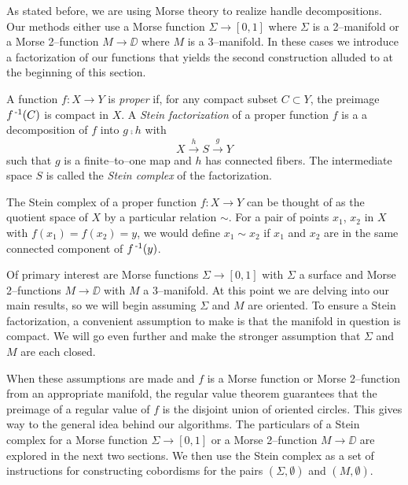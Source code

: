 As stated before, we are using Morse theory to realize handle decompositions.
Our methods either use a Morse function $\Sigma\to[0,1]$ where $\Sigma$ is a 2--manifold or a Morse 2--function $M\to\DD$ where $M$ is a 3--manifold.
In these cases we introduce a factorization of our functions that yields the second construction alluded to at the beginning of this section.

\begin{defn}
	\label{def:stein}
	A function $f:X\to Y$ is \emph{proper} if, for any compact subset $C\subset Y$, the preimage $f^{\,\text{-}1}(C)$ is compact in $X$.
	A \emph{Stein factorization} of a proper function $f$ is a a decomposition of $f$ into $g\comp h$ with $$X\overset{h}{\to} S \overset{g}{\to} Y$$ such that $g$ is a finite--to--one map and $h$ has connected fibers.
	The intermediate space $S$ is called the \emph{Stein complex} of the factorization.
\end{defn}

The Stein complex of a proper function $f:X\to Y$ can be thought of as the quotient space of $X$ by a particular relation $\sim$.
For a pair of points $x_1$, $x_2$ in $X$ with $f(x_1)=f(x_2)=y$, we would define $x_1\sim x_2$ if $x_1$ and $x_2$ are in the same connected component of $f^{\,\text{-}1}(y)$.

Of primary interest are Morse functions $\Sigma\to[0,1]$ with $\Sigma$ a surface and Morse 2--functions $M\to\DD$ with $M$ a 3--manifold.
At this point we are delving into our main results, so we will begin assuming $\Sigma$ and $M$ are oriented.
To ensure a Stein factorization, a convenient assumption to make is that the manifold in question is compact.
We will go even further and make the stronger assumption that $\Sigma$ and $M$ are each closed.

When these assumptions are made and $f$ is a Morse function or Morse 2--function from an appropriate manifold, the regular value theorem guarantees that the preimage of a regular value of $f$ is the disjoint union of oriented circles.
This gives way to the general idea behind our algorithms.
The particulars of a Stein complex for a Morse function $\Sigma\to[0,1]$ or a Morse 2--function $M\to\DD$ are explored in the next two sections.
We then use the Stein complex as a set of instructions for constructing cobordisms for the pairs $(\Sigma,\emptyset)$ and $(M,\emptyset)$.
